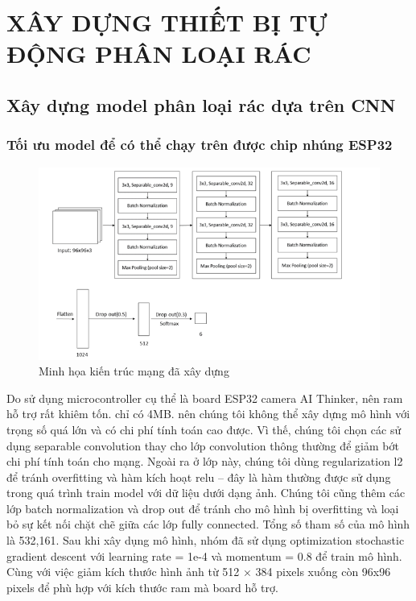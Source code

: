 

\chapter{XÂY DỰNG THIẾT BỊ TỰ ĐỘNG PHÂN LOẠI RÁC}



\section{Xây dựng model phân loại rác dựa trên CNN}



\subsection{Tối ưu model để có thể chạy trên được chip nhúng ESP32}
\begin{figure}[ht]
    \centering
    \includegraphics[width=\linewidth]{images/Quanh/ktmang.png}
    \caption{ Minh họa kiến trúc mạng đã xây dựng}
    \label{fig:kientrucmang}
\end{figure}

Do sử dụng microcontroller cụ thể là board ESP32 camera AI Thinker, nên ram hỗ trợ rất khiêm tốn. chỉ có 4MB. nên chúng tôi không thể xây dựng mô hình với trọng số quá lớn và có chi phí tính toán cao được. Vì thế, chúng tôi chọn các sử dụng separable convolution thay cho lớp convolution thông thường để giảm bớt chi phí tính toán cho mạng. Ngoài ra ở lớp này, chúng tôi dùng regularization l2 để tránh overfitting và hàm kích hoạt relu – đây là hàm thường được sử dụng trong quá trình train model với dữ liệu dưới dạng ảnh. Chúng tôi cũng thêm các lớp batch normalization và drop out để tránh cho mô hình bị overfitting và loại bỏ sự kết nối chặt chẽ giữa các lớp fully connected. Tổng số tham số của mô hình là 532,161. Sau khi xây dụng mô hình, nhóm đã sử dụng optimization stochastic gradient descent với learning rate = 1e-4 và momentum = 0.8 để train mô hình. Cùng với việc giảm kích thước hình ảnh từ 512 × 384 pixels xuống còn 96x96 pixels để phù hợp với kích thước ram mà board hỗ trợ.

